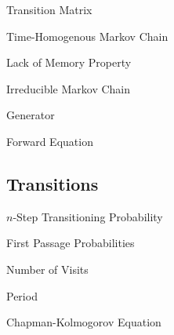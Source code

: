 \documentclass[11pt,a4paper]{article}
\begin{document}
\begin{definition}{Transition Matrix}
\end{definition}

\begin{definition}{Time-Homogenous Markov Chain}

\end{definition}

\begin{remark}{Lack of Memory Property}

\end{remark}

\begin{definition}{Irreducible Markov Chain}

\end{definition}

\begin{definition}{Generator}

\end{definition}

\begin{definition}{Forward Equation}

\end{definition}

\subsection{Transitions}

\begin{theorem}{$n$-Step Transitioning Probability}
\end{theorem}

\begin{theorem}{First Passage Probabilities}
\end{theorem}

\begin{theorem}{Number of Visits}

\end{theorem}

\begin{definition}{Period}
\end{definition}

\begin{theorem}{Chapman-Kolmogorov Equation}

\end{theorem}
\end{document}
